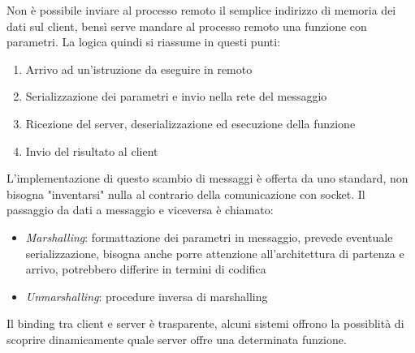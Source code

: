 Non è possibile inviare al processo remoto il semplice indirizzo di memoria dei 
dati sul client, bensì serve mandare al processo remoto una funzione con parametri.
La logica quindi si riassume in questi punti:
\begin{enumerate}
    \item Arrivo ad un'istruzione da eseguire in remoto
    \item Serializzazione dei parametri e invio nella rete del messaggio
    \item Ricezione del server, deserializzazione ed esecuzione della funzione
    \item Invio del risultato al client
\end{enumerate}
L'implementazione di questo scambio di messaggi è offerta da uno standard, 
non bisogna "inventarsi" nulla al contrario della comunicazione con socket.
Il passaggio da dati a messaggio e viceversa è chiamato:
\begin{itemize}
    \item \emph{Marshalling}: formattazione dei parametri in messaggio, prevede
    eventuale serializzazione, bisogna anche porre attenzione all'architettura
    di partenza e arrivo, potrebbero differire in termini di codifica
    \item \emph{Unmarshalling}: procedure inversa di marshalling
\end{itemize}
Il binding tra client e server è trasparente, alcuni sistemi offrono la possiblità 
di scoprire dinamicamente quale server offre una determinata funzione.

